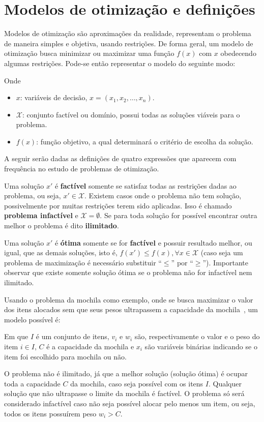 \section{Modelos de otimização e definições}\label{sec:modelos-de-otimizacao}

Modelos de otimização são aproximações da realidade, representam o problema de maneira simples
e objetiva, usando restrições.
De forma geral, um modelo de otimização busca minimizar ou maximizar uma função $f(x)$ com $x$
obedecendo algumas restrições.
Pode-se então representar o modelo do seguinte modo:



Onde

\begin{itemize}
    \item $x$: variáveis de decisão, $x = (x_1, x_2, \dots, x_n)$.
    \item $\mathcal{X}$: conjunto factível ou domínio, possui todas as soluções viáveis para o problema.
    \item $f(x)$: função objetivo, a qual determinará o critério de escolha da solução.
\end{itemize}

A seguir serão dadas as definições de quatro expressões que aparecem com frequência no estudo de
problemas de otimização.

Uma solução $x'$ é \textbf{factível} somente se satisfaz todas as restrições dadas ao problema,
ou seja, $x' \in \mathcal{X}$.
Existem casos onde o problema não tem solução, possivelmente por muitas restrições terem sido
aplicadas.
Isso é chamado \textbf{problema infactível} e $\mathcal{X} = \emptyset$.
Se para toda solução for possível encontrar outra melhor o problema é dito \textbf{ilimitado}.

Uma solução $x'$ é \textbf{ótima} somente se for \textbf{factível} e possuir resultado melhor,
ou igual, que as demais soluções, isto é, $f(x') \le f(x), \forall x \in \mathcal{X}$ (caso seja um
problema de maximização é necessário substituir “$\le$” por “$\ge$”).
Importante observar que existe somente solução ótima se o problema não for infactível nem ilimitado.

Usando o problema da mochila como exemplo, onde se busca maximizar o valor dos itens alocados
sem que seus pesos ultrapassem a capacidade da mochila~\cite{exact-solution-techniques},
um modelo possível é:



Em que $I$ é um conjunto de itens, $v_{i}$ e $w_{i}$ são, respectivamente o valor e o peso do item
$i \in I$, $C$ é a capacidade da mochila e $x_{i}$ são variáveis binárias indicando se o
item foi escolhido para mochila ou não.

O problema não é ilimitado, já que a melhor solução (solução ótima) é ocupar toda a capacidade $C$
da mochila, caso seja possível com os itens $I$.
Qualquer solução que não ultrapasse o limite da mochila é factível.
O problema só será considerado infactível caso não seja possível alocar pelo menos um item, ou seja,
todos os itens possuírem peso $w_i > C$.

